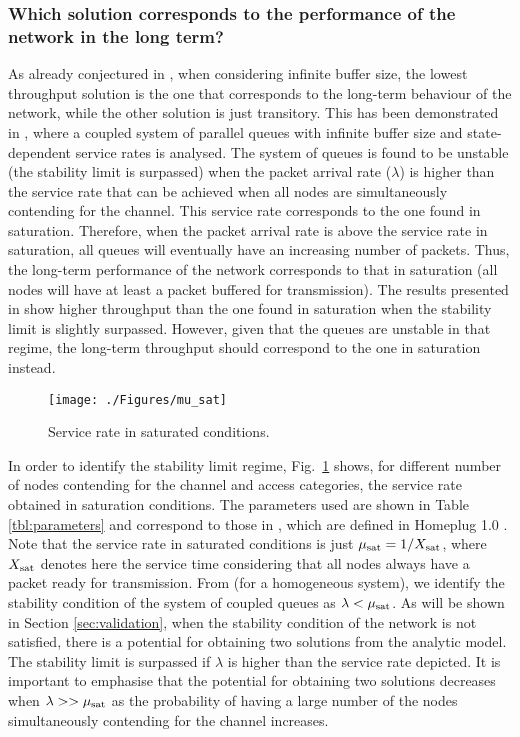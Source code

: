 \documentclass[preprint,12pt]{elsarticle}
\begin{document}
\subsubsection{Which solution corresponds to the performance of the network in the long term?}

As already conjectured in \cite{Duffy2010}, when considering infinite buffer size, the lowest throughput solution is the one that corresponds to the long-term behaviour of the network, while the other solution is just transitory. This has been demonstrated in \cite{borst2008stability}, where a coupled system of parallel queues with infinite buffer size and state-dependent service rates is analysed. The system of queues is found to be unstable (the stability limit is surpassed) when the packet arrival rate ($\lambda$) is higher than the service rate that can be achieved when all nodes are simultaneously contending for the channel. This service rate corresponds to the one found in saturation. Therefore, when the packet arrival rate is above the service rate in saturation, all queues will eventually have an increasing number of packets. Thus, the long-term performance of the network corresponds to that in saturation (all nodes will have at least a packet buffered for transmission). The results presented in \cite{chung2006performance} show higher throughput than the one found in saturation when the stability limit is slightly surpassed. However, given that the queues are unstable in that regime, the long-term throughput should correspond to the one in saturation instead.   



\begin{figure}[!hhhhtb]
\centering
\texttt{[image: ./Figures/mu\_sat]}
\caption{Service rate in saturated conditions.}
\label{fig:mu_sat}
\end{figure}

In order to identify the stability limit regime, Fig.~\ref{fig:mu_sat} shows, for different number of nodes contending for the channel and access categories, the service rate obtained in saturation conditions. The parameters used are shown in Table \ref{tbl:parameters} and correspond to those in \cite{chung2006performance}, which are defined in Homeplug 1.0 \cite{HomeplugStd}. Note that the service rate in saturated conditions is just $\mu_{\rm sat} = 1/X_{\rm sat}$, where $X_{\rm sat}$ denotes here the service time considering that all nodes always have a packet ready for transmission. From \cite{borst2008stability} (for a homogeneous system), we identify the stability condition of the system of coupled queues as $\lambda < \mu_{\rm sat}$. As will be shown in Section \ref{sec:validation}, when the stability condition of the network is not satisfied, there is a potential for obtaining two solutions from the analytic model. The stability limit is surpassed if $\lambda$ is higher than the service rate depicted. It is important to emphasise that the potential for obtaining two solutions decreases when $\lambda >> \mu_{\rm sat}$ as the probability of having a large number of the nodes simultaneously contending for the channel increases.
\end{document}

